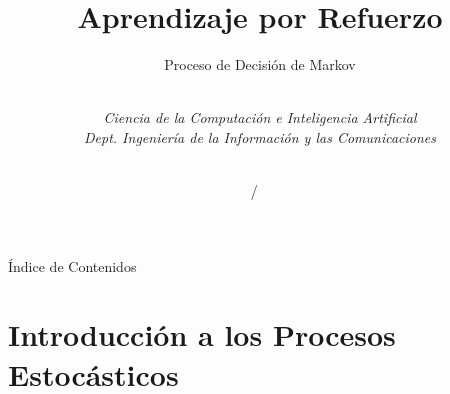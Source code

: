 \documentclass[10pt, envcountsect, handout, aspectratio=1610, hyperref={hypertexnames=true}]{beamer}
\title[Aprendizaje por Refuerzo]{Aprendizaje por Refuerzo}
\subtitle{Proceso de Decisión de Markov} %
\author[L. D. Hernández] %
{%
	\sc{Luis Daniel Hernández Molinero }\\ %
	\textit{Ciencia de la Computación e Inteligencia Artificial}\\  %
	\textit{Dept. Ingeniería de la Información y las Comunicaciones}\\  %
	\\   %
}
\institute[DIIC]%
{
	\textit{Universidad de Murcia}
}
\date{\arabic{yearnext} / \the\year\ } %
\begin{document}
	











\begin{frame}[plain]
	\titlepage
\end{frame}


\begin{frame}{Índice de Contenidos}
	\tableofcontents 
\end{frame}



\section{Introducción a los Procesos Estocásticos}
\end{document}

